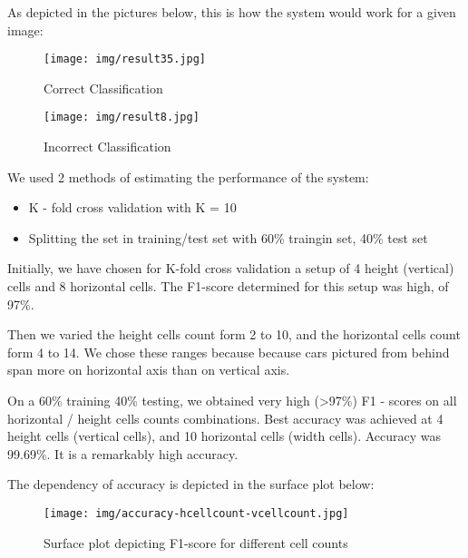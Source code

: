 As depicted in the pictures below, this is how the system would work for a given image:

\begin{figure}[htb]
	\begin{center}
		\texttt{[image: img/result35.jpg]}
	    \caption{Correct Classification \label{img:result35}}
    \end{center}
\end{figure}

\begin{figure}[htb]
	\begin{center}
		\texttt{[image: img/result8.jpg]}
	    \caption{Incorrect Classification \label{img:result8}}
    \end{center}
\end{figure}

We used 2 methods of estimating the performance of the system:

\begin{itemize}
\item K - fold cross validation with K = 10
\item Splitting the set in training/test set with 60\% traingin set, 40\% test set
\end{itemize}

Initially, we have chosen for K-fold cross validation a setup of 4 height (vertical) cells and 8 horizontal cells. The F1-score determined for this setup was high, of 97\%.

Then we varied the height cells count form 2 to 10, and the horizontal cells count form 4 to 14. We chose these ranges because because cars pictured from behind span more on horizontal axis than on vertical axis.

On a 60\% training 40\% testing, we obtained very high (>97\%) F1 - scores on all horizontal / height cells counts combinations. Best accuracy was achieved at 4 height cells (vertical cells), and 10 horizontal cells (width cells).  Accuracy was 99.69\%. It is a remarkably high accuracy.

The dependency of accuracy is depicted in the surface plot below:

\begin{figure}[htb]
	\begin{center}
		\texttt{[image: img/accuracy-hcellcount-vcellcount.jpg]}
	    \caption{Surface plot depicting F1-score for different cell counts \label{img:accuracy-hcellcount-vcellcount}}
    \end{center}
\end{figure}

